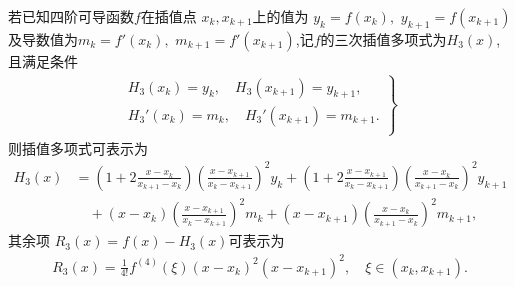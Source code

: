 \documentclass[../../main.tex]{subfiles}%
\begin{document}
\begin{theorem}[两点三次插值多项式]
若已知四阶可导函数${\textstyle f}$在插值点 ${\textstyle x_k,x_{k+1}}$上的值为 ${\textstyle y_k=f(x_k),\,\, y_{k+1}=f(x_{k+1})}$及导数值为${\textstyle m_k=f'(x_k),\,\, m_{k+1}=f'(x_{k+1})}$,记$f$的三次插值多项式为$H_3(x)$,且满足条件
\begin{align}
\left. \begin{array}{r}
H_3(x_k)=y_k,\quad H_3(x_{k+1})=y_{k+1},\\
H_3'(x_k)=m_k,\quad H_3' (x_{k+1})=m_{k+1}.\\
\end{array} \right\} \label{eq:数值分析-4.6}
\end{align}
则插值多项式可表示为
\begin{align}
H_3(x) &= \left( 1 + 2 \frac{x - x_k}{x_{k+1} - x_k} \right) \left( \frac{x - x_{k+1}}{x_k - x_{k+1}} \right)^2 y_k + \left( 1 + 2 \frac{x - x_{k+1}}{x_k - x_{k+1}} \right) \left( \frac{x - x_k}{x_{k+1} - x_k} \right)^2 y_{k+1} \nonumber \\
&\quad + (x - x_k) \left( \frac{x - x_{k+1}}{x_k - x_{k+1}} \right)^2 m_k + (x - x_{k+1}) \left( \frac{x - x_k}{x_{k+1} - x_k} \right)^2 m_{k+1}, \label{eq:数值分析-4.12}
\end{align}
其余项 $R_3(x) = f(x) - H_3(x)$可表示为
\begin{align}
R_3(x) = \frac{1}{4!} f^{(4)}(\xi) (x - x_k)^2 (x - x_{k+1})^2, \quad \xi \in (x_k, x_{k+1}). \label{eq:数值分析-4.13}
\end{align}
\end{theorem}
\end{document}
